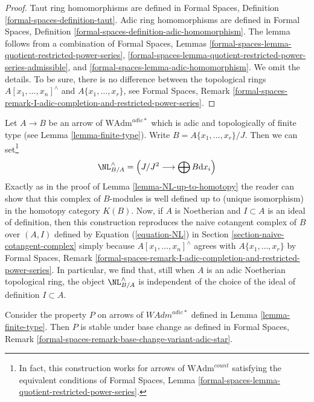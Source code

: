 \begin{proof}
Taut ring homomorphisms are defined in
Formal Spaces, Definition \ref{formal-spaces-definition-taut}.
Adic ring homomorphisms are defined in
Formal Spaces, Definition
\ref{formal-spaces-definition-adic-homomorphism}.
The lemma follows from a combination of
Formal Spaces, Lemmas
\ref{formal-spaces-lemma-quotient-restricted-power-series},
\ref{formal-spaces-lemma-quotient-restricted-power-series-admissible}, and
\ref{formal-spaces-lemma-adic-homomorphism}. We omit the details.
To be sure, there is no difference between the topological rings
$A[x_1, \ldots, x_n]^\wedge$ and $A\{x_1, \ldots, x_r\}$, see
Formal Spaces, Remark
\ref{formal-spaces-remark-I-adic-completion-and-restricted-power-series}.
\end{proof}

\begin{remark}
\label{remark-NL-well-defined-topological}
Let $A \to B$ be an arrow of $\text{WAdm}^{adic*}$ which is adic and
topologically of finite type (see Lemma \ref{lemma-finite-type}). Write
$B = A\{x_1, \ldots, x_r\}/J$. Then we can set\footnote{In fact, this
construction works for arrows of $\text{WAdm}^{count}$ satisfying the
equivalent conditions of Formal Spaces, Lemma
\ref{formal-spaces-lemma-quotient-restricted-power-series}.}
$$
\NL_{B/A}^\wedge = \left(J/J^2 \longrightarrow \bigoplus B\text{d}x_i\right)
$$
Exactly as in the proof of Lemma \ref{lemma-NL-up-to-homotopy}
the reader can show that this complex of $B$-modules is
well defined up to (unique isomorphism) in the homotopy category $K(B)$.
Now, if $A$ is Noetherian and $I \subset A$ is an ideal of definition,
then this construction reproduces the naive cotangent complex
of $B$ over $(A, I)$ defined by Equation (\ref{equation-NL})
in Section \ref{section-naive-cotangent-complex} simply because
$A[x_1, \ldots, x_n]^\wedge$ agrees with $A\{x_1, \ldots, x_r\}$ by
Formal Spaces, Remark
\ref{formal-spaces-remark-I-adic-completion-and-restricted-power-series}.
In particular, we find that, still when $A$ is an adic Noetherian
topological ring, the object $\NL_{B/A}^\wedge$ is independent
of the choice of the ideal of definition $I \subset A$.
\end{remark}

\begin{lemma}
\label{lemma-base-change-finite-type}
Consider the property $P$ on arrows of $\textit{WAdm}^{adic*}$ defined in
Lemma \ref{lemma-finite-type}. Then $P$ is stable under base change as
defined in Formal Spaces, Remark
\ref{formal-spaces-remark-base-change-variant-adic-star}.
\end{lemma}

